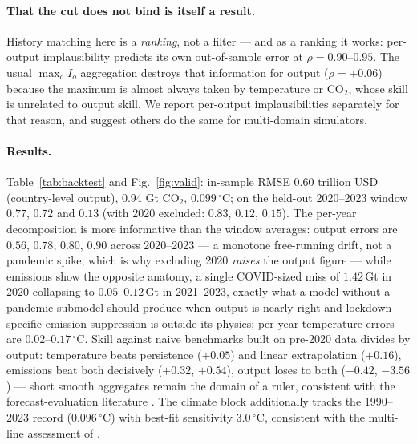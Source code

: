 \documentclass[12pt,a4paper]{article}
\newcommand{\degC}{$^{\circ}$C}
\newcommand{\rmseGdpIn}{0.60}          \newcommand{\rmseCoTwoIn}{0.94}
\newcommand{\rmseTempIn}{0.099}        \newcommand{\rmseTempInStoch}{0.145}
\newcommand{\rmseGdpOut}{0.77}         \newcommand{\rmseCoTwoOut}{0.72}
\newcommand{\rmseTempOut}{0.13}
\newcommand{\rmseGdpOutX}{0.83}        \newcommand{\rmseCoTwoOutX}{0.12}
\newcommand{\rmseTempOutX}{0.15}
\begin{document}
\paragraph{That the cut does not bind is itself a result.} History matching here is a
\emph{ranking}, not a filter --- and as a ranking it works: per-output implausibility predicts
its own out-of-sample error at $\rho=0.90$--$0.95$. The usual $\max_o I_o$ aggregation
destroys that information for output ($\rho=+0.06$) because the maximum is almost always taken
by temperature or CO$_2$, whose skill is unrelated to output skill. We report per-output
implausibilities separately for that reason, and suggest others do the same for multi-domain
simulators.

\paragraph{Results.} Table~\ref{tab:backtest} and Fig.~\ref{fig:valid}: in-sample RMSE
$\rmseGdpIn$ trillion USD (country-level output), $\rmseCoTwoIn$ Gt CO$_2$,
$\rmseTempIn$\,\degC; on the held-out 2020--2023 window $\rmseGdpOut$, $\rmseCoTwoOut$ and
$\rmseTempOut$ (with 2020 excluded: $\rmseGdpOutX$, $\rmseCoTwoOutX$, $\rmseTempOutX$). The
per-year decomposition is more informative than the window averages: output errors are $0.56$,
$0.78$, $0.80$, $0.90$ across 2020--2023 --- a monotone free-running drift, not a pandemic
spike, which is why excluding 2020 \emph{raises} the output figure --- while emissions show
the opposite anatomy, a single COVID-sized miss of $1.42$\,Gt in 2020 collapsing to
$0.05$--$0.12$\,Gt in 2021--2023, exactly what a model without a pandemic submodel should
produce when output is nearly right and lockdown-specific emission suppression is outside its
physics; per-year temperature errors are $0.02$--$0.17$\,\degC. Skill against naive benchmarks
built on pre-2020 data divides by output: temperature beats persistence ($+0.05$) and linear
extrapolation ($+0.16$), emissions beat both decisively ($+0.32$, $+0.54$), output loses to
both ($-0.42$, $-3.56$) --- short smooth aggregates remain the domain of a ruler, consistent
with the forecast-evaluation literature \citep{celasun2021}. The climate block additionally
tracks the 1990--2023 record ($0.096$\,\degC) with best-fit sensitivity $3.0$\,\degC,
consistent with the multi-line assessment of \citet{sherwood2020}.
\end{document}
